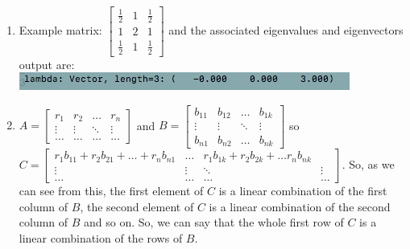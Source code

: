 \documentclass{article}
\begin{document}
\begin{enumerate}
\item Example matrix: $
\begin{bmatrix}
\frac{1}{2}	&1	&\frac{1}{2}\\
1	&2	&1\\
\frac{1}{2}	&1	&\frac{1}{2}
\end{bmatrix}
$ and the associated eigenvalues and eigenvectors output are:\\
\includegraphics[scale=0.7]{exercise7}

\item $A = 
\begin{bmatrix}
r_1	&r_2	&\dots	&r_n\\
\vdots	&\vdots	&\ddots	&\vdots\\
\dots	&\dots	&\dots	&\dots	
\end{bmatrix}
$ and $B = 
\begin{bmatrix}
b_{11}	&b_{12}	&\dots	&b_{1k}\\
\vdots	&\vdots	&\ddots	&\vdots\\
b_{n1}	&b_{n2}	&\dots	&b_{nk}
\end{bmatrix}
$ so $C = 
\begin{bmatrix}
r_1b_{11} + r_2b_{21} + \dots + r_nb_{n1}	&\dots	&r_1b_{1k} + r_2b_{2k} + \dots r_nb_{nk}\\
\vdots	&\vdots	&\ddots	&\vdots\\
\dots	&\dots	&\dots	&\dots
\end{bmatrix}
$. So, as we can see from this, the first element of $C$ is a linear combination of the first column of $B$, the second element of $C$ is a linear combination of the second column of $B$ and so on. So, we can say that the whole first row of $C$ is a linear combination of the rows of $B$. 


\end{enumerate}
\end{document}
